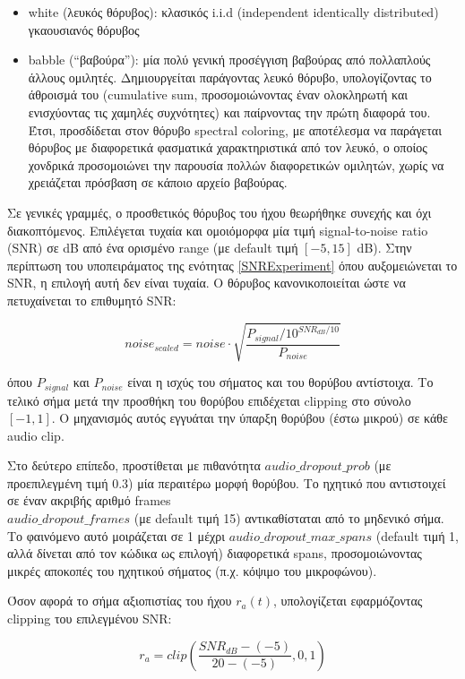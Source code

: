  \begin{itemize}
 \item white (λευκός θόρυβος): κλασικός i.i.d (independent identically distributed) γκαουσιανός θόρυβος
 
 \item babble (``βαβούρα''): μία πολύ γενική προσέγγιση βαβούρας από πολλαπλούς άλλους ομιλητές. Δημιουργείται παράγοντας λευκό θόρυβο, υπολογίζοντας το άθροισμά του (cumulative sum, προσομοιώνοντας έναν ολοκληρωτή και ενισχύοντας τις χαμηλές συχνότητες) και παίρνοντας την πρώτη διαφορά του. Έτσι, προσδίδεται στον θόρυβο spectral coloring, με αποτέλεσμα να παράγεται θόρυβος με διαφορετικά φασματικά χαρακτηριστικά από τον λευκό, ο οποίος χονδρικά προσομοιώνει την παρουσία πολλών διαφορετικών ομιλητών, χωρίς να χρειάζεται πρόσβαση σε κάποιο αρχείο βαβούρας.
 \end{itemize}
 
 Σε γενικές γραμμές, ο προσθετικός θόρυβος του ήχου θεωρήθηκε συνεχής και όχι διακοπτόμενος. Επιλέγεται τυχαία και ομοιόμορφα μία τιμή signal-to-noise ratio (SNR) σε dB από ένα ορισμένο range (με default τιμή $[-5,15]$ dB). Στην περίπτωση του υποπειράματος της ενότητας \ref{SNRExperiment} όπου αυξομειώνεται το SNR, η επιλογή αυτή δεν είναι τυχαία. Ο θόρυβος κανονικοποιείται ώστε να πετυχαίνεται το επιθυμητό SNR:
 
 \[
 noise_{scaled} = noise \cdot \sqrt{\frac{P_{signal}/10^{SNR_{dB}/10}}{P_{noise}}}
 \]
 
 όπου $P_{signal}$ και $P_{noise}$ είναι η ισχύς του σήματος και του θορύβου αντίστοιχα. Το τελικό σήμα μετά την προσθήκη του θορύβου επιδέχεται clipping στο σύνολο $[-1,1]$. Ο μηχανισμός αυτός εγγυάται την ύπαρξη θορύβου (έστω μικρού) σε κάθε audio clip.
 
 Στο δεύτερο επίπεδο, προστίθεται με πιθανότητα $audio\_dropout\_prob$ (με προεπιλεγμένη τιμή 0.3) μία περαιτέρω μορφή θορύβου. Το ηχητικό που αντιστοιχεί σε έναν ακριβής αριθμό frames \\ $audio\_dropout\_frames$ (με default τιμή 15) αντικαθίσταται από το μηδενικό σήμα. Το φαινόμενο αυτό μοιράζεται σε 1 μέχρι $audio\_dropout\_max\_spans$ (default τιμή 1, αλλά δίνεται από τον κώδικα ως επιλογή) διαφορετικά spans, προσομοιώνοντας μικρές αποκοπές του ηχητικού σήματος (π.χ. κόψιμο του μικροφώνου). 
 
 Όσον αφορά το σήμα αξιοπιστίας του ήχου $r_a(t)$, υπολογίζεται εφαρμόζοντας clipping του επιλεγμένου SNR:
 
 \[
 r_a = clip(\frac{SNR_{dB} - (-5)}{20 - (-5)}, 0, 1)
 \]
 
